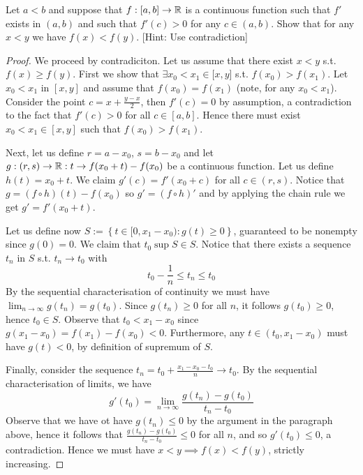 \begin{exercise}
  Let $a<b$ and suppose that $f:[a,b]\to\mathbb R$ is a continuous function such that $f'$
  exists in $(a,b)$ and such that $f'(c)>0$ for any $c\in(a,b)$. Show that for
  any $x<y$ we have $f(x)<f(y)$. [Hint: Use contradiction]
  \label{ex:stricIncreasing}
\end{exercise}
\begin{proof}
  We proceed by contradiciton. Let us assume that there exist $x<y$ s.t. $f(x)\geq f(y)$.
  First we show that $\exists x_0<x_1\in[x,y$] s.t.  $f(x_0)>f(x_1)$. Let $x_0<x_1$ in
  $[x,y]$ and assume that $f(x_0)=f(x_1)$ (note, for any $x_0<x_1$). Consider the point
  $c=x+\frac{y-x}{2}$, then $f'(c)=0$ by assumption, a contradiction to the fact that
  $f'(c)>0$ for all $c\in[a,b]$.  Hence there must exist $x_0<x_1\in[x,y]$ such that
  $f(x_0)>f(x_1)$.

  Next, let us define $r=a-x_0$, $s=b-x_0$ and let $g:(r,s)\to\mathbb R:t\to f(x_0+t)-f(x_0)$ be
  a continuous function. Let us define $h(t)=x_0+t$. We claim $g'(c)=f'(x_0+c)$ for all
  $c\in(r,s)$. Notice that $g=(f\circ h)(t) - f(x_0)$ so $g'=(f\circ h)'$ and by applying
  the chain rule we get $g'= f'(x_0+t)$.

  Let us define now $S:=\left\{ t\in[0,x_1-x_0) : g(t)\geq 0 \right\}$, guaranteed to be
  nonempty since $g(0)=0$. We claim that $t_0\sup S\in S$. Notice that there
  exists a sequence $t_n$ in $S$ s.t. $t_n\to t_0$ with
  \[t_0-\frac{1}{n}\leq t_n \leq t_0\]
  By the sequential characterisation of continuity we must have
  $\lim_{n\to\infty}g(t_n)=g(t_0)$. Since $g(t_n)\geq 0$ for all $n$, it follows
  $g(t_0)\geq 0$, hence $t_0\in S$. Observe that $t_0<x_1-x_0$ since
  $g(x_1-x_0)=f(x_1)-f(x_0)<0$. Furthermore, any $t\in(t_0,x_1-x_0)$ must have $g(t)<0$,
  by definition of supremum of $S$.

  Finally, consider the sequence $t_n=t_0+\frac{x_1-x_0-t_0}{n}\to t_0$. By the sequential
  characterisation of limits, we have 
  \[g'(t_0)= \lim_{n\to \infty} \frac{g(t_n)-g(t_0)}{t_n-t_0}\]
  Observe that we have ot have $g(t_n)\leq 0$ by the argument in the paragraph above, hence it
  follows that $\frac{g(t_n)-g(t_0)}{t_n-t_0}\leq 0$ for all $n$, and so $g'(t_0)\leq 0$,
  a contradiction. Hence we must have $x<y\implies f(x)<f(y)$, strictly increasing.
\end{proof}
